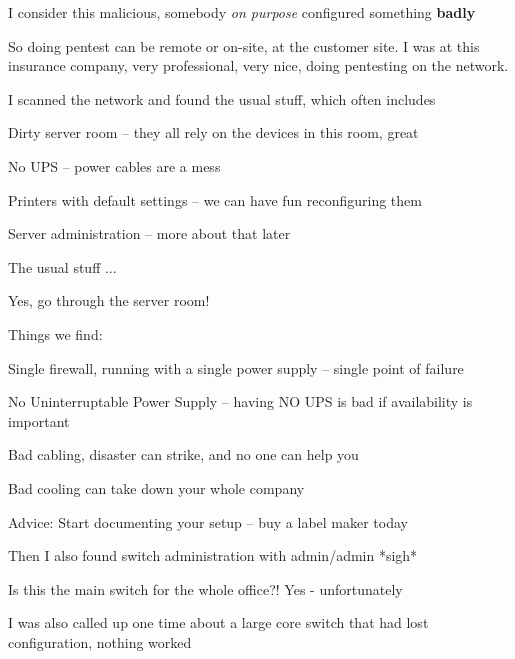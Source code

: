 \documentclass[Screen16to9,17pt]{foils}
\begin{document}
I consider this malicious, somebody \emph{on purpose} configured something {\bf badly}



So doing pentest can be remote or on-site, at the customer site. I was at this insurance company, very professional, very nice, doing pentesting on the network.

I scanned the network and found the usual stuff, which often includes
\begin{list2}
\item Dirty server room -- they all rely on the devices in this room, great
\item No UPS -- power cables are a mess
\item Printers with default settings -- we can have fun reconfiguring them
\item Server administration -- more about that later
\end{list2}

The usual stuff ...





Yes, go through the server room!

Things we find:
\begin{list2}
\item Single firewall, running with a single power supply -- single point of failure
\item No Uninterruptable Power Supply -- having NO UPS is bad if availability is important
\item Bad cabling, disaster can strike, and no one can help you
\item Bad cooling can take down your whole company
\end{list2}

Advice: Start documenting your setup -- buy a label maker today


Then I also found switch administration with admin/admin *sigh*


\begin{list2}
\item Is this the main switch for the whole office?! Yes - unfortunately
\item I was also called up one time about a large core switch that had lost configuration, nothing worked
\end{list2}
\end{document}
